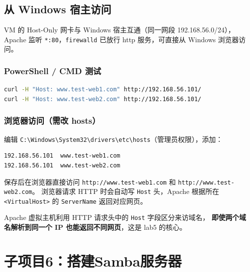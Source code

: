 \documentclass[12pt,a4paper]{ctexart}
\begin{document}
\subsection{从 Windows 宿主访问}

VM 的 Host-Only 网卡与 Windows 宿主互通（同一网段 192.168.56.0/24），
Apache 监听 \texttt{*:80}，\texttt{firewalld} 已放行 http 服务，可直接从 Windows 浏览器访问。

\subsubsection{PowerShell / CMD 测试}

\begin{cmdbox}
\begin{lstlisting}[language=bash,numbers=none]
curl -H "Host: www.test-web1.com" http://192.168.56.101/
curl -H "Host: www.test-web2.com" http://192.168.56.101/
\end{lstlisting}
\end{cmdbox}

\subsubsection{浏览器访问（需改 hosts）}

编辑 \texttt{C:\textbackslash Windows\textbackslash System32\textbackslash drivers\textbackslash etc\textbackslash hosts}（管理员权限），添加：

\begin{cmdbox}
\begin{lstlisting}[language=bash,numbers=none]
192.168.56.101  www.test-web1.com
192.168.56.101  www.test-web2.com
\end{lstlisting}
\end{cmdbox}

保存后在浏览器直接访问 \texttt{http://www.test-web1.com} 和 \texttt{http://www.test-web2.com}。
浏览器请求 HTTP 时会自动写 \texttt{Host} 头，Apache 根据所在 \texttt{<VirtualHost>} 的 \texttt{ServerName}
返回对应网页。

\begin{infobox}
  Apache 虚拟主机利用 HTTP 请求头中的 \texttt{Host} 字段区分来访域名，
  \textbf{即使两个域名解析到同一个 IP 也能返回不同网页}，这是 lab5 的核心。
\end{infobox}

\newpage
\section{子项目6：搭建Samba服务器}
\end{document}
